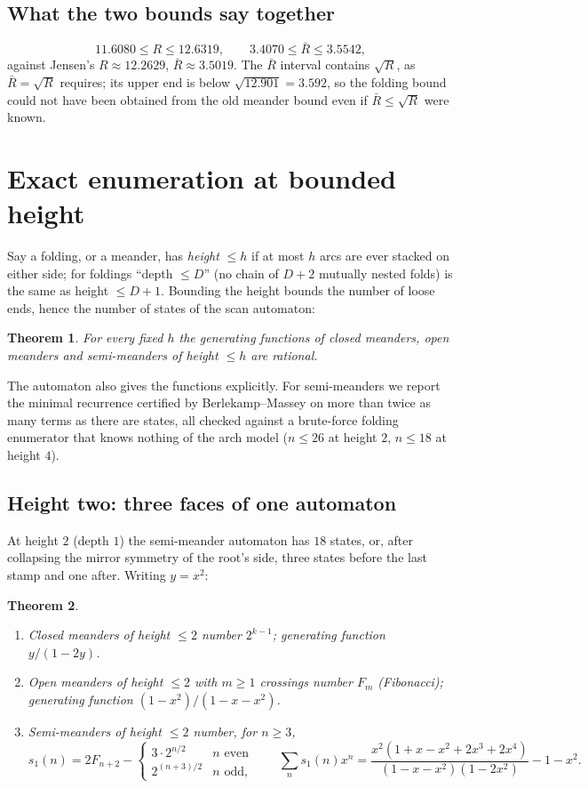 \documentclass[11pt]{amsart}
\newtheorem{theorem}{Theorem}[section]
\theoremstyle{definition}
\newcommand{\Rb}{\bar R}
\begin{document}
\subsection{What the two bounds say together}
\[
11.6080\le R\le12.6319,\qquad 3.4070\le\Rb\le3.5542,
\]
against Jensen's $R\approx12.2629$, $\Rb\approx3.5019$. The $\Rb$ interval contains $\sqrt R$, as $\Rb=\sqrt R$ requires; its upper end is below $\sqrt{12.901}=3.592$, so the folding bound could not have been obtained from the old meander bound even if $\Rb\le\sqrt R$ were known.

\section{Exact enumeration at bounded height}\label{sec:exact}

Say a folding, or a meander, has \emph{height} $\le h$ if at most $h$ arcs are ever stacked on either side; for foldings ``depth $\le D$'' (no chain of $D+2$ mutually nested folds) is the same as height $\le D+1$. Bounding the height bounds the number of loose ends, hence the number of states of the scan automaton:

\begin{theorem}\label{thm:rational}
For every fixed $h$ the generating functions of closed meanders, open meanders and semi-meanders of height $\le h$ are rational.
\end{theorem}

The automaton also gives the functions explicitly. For semi-meanders we report the minimal recurrence certified by Berlekamp--Massey on more than twice as many terms as there are states, all checked against a brute-force folding enumerator that knows nothing of the arch model ($n\le26$ at height $2$, $n\le18$ at height $4$).

\subsection{Height two: three faces of one automaton}
At height $2$ (depth $1$) the semi-meander automaton has $18$ states, or, after collapsing the mirror symmetry of the root's side, three states before the last stamp and one after. Writing $y=x^2$:

\begin{theorem}\label{thm:height2}
\begin{enumerate}[nosep]
\item Closed meanders of height $\le2$ number $2^{k-1}$; generating function $y/(1-2y)$.
\item Open meanders of height $\le2$ with $m\ge1$ crossings number $F_m$ (Fibonacci); generating function $(1-x^2)/(1-x-x^2)$.
\item Semi-meanders of height $\le2$ number, for $n\ge3$,
\[
s_1(n)=2F_{n+2}-\begin{cases}3\cdot2^{n/2}&n\text{ even}\\2^{(n+3)/2}&n\text{ odd,}\end{cases}
\qquad\sum_{n}s_1(n)x^n=\frac{x^2(1+x-x^2+2x^3+2x^4)}{(1-x-x^2)(1-2x^2)}-1-x^2 .
\]
\end{enumerate}
\end{theorem}
\end{document}
